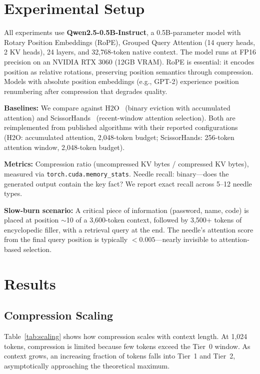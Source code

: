 \documentclass[11pt]{article}
\begin{document}
\section{Experimental Setup}

All experiments use \textbf{Qwen2.5-0.5B-Instruct}, a 0.5B-parameter model with Rotary Position Embeddings (RoPE), Grouped Query Attention (14 query heads, 2 KV heads), 24 layers, and 32,768-token native context. The model runs at FP16 precision on an NVIDIA RTX 3060 (12GB VRAM). RoPE is essential: it encodes position as relative rotations, preserving position semantics through compression. Models with absolute position embeddings (e.g., GPT-2) experience position renumbering after compression that degrades quality.

\textbf{Baselines:} We compare against H2O~\cite{h2o} (binary eviction with accumulated attention) and ScissorHands~\cite{scissorhands} (recent-window attention selection). Both are reimplemented from published algorithms with their reported configurations (H2O: accumulated attention, 2,048-token budget; ScissorHands: 256-token attention window, 2,048-token budget).

\textbf{Metrics:} Compression ratio (uncompressed KV bytes / compressed KV bytes), measured via \texttt{torch.cuda.memory\_stats}. Needle recall: binary---does the generated output contain the key fact? We report exact recall across 5--12 needle types.

\textbf{Slow-burn scenario:} A critical piece of information (password, name, code) is placed at position $\sim$10 of a 3,600-token context, followed by 3,500+ tokens of encyclopedic filler, with a retrieval query at the end. The needle's attention score from the final query position is typically $<0.005$---nearly invisible to attention-based selection.

\section{Results}

\subsection{Compression Scaling}

Table~\ref{tab:scaling} shows how compression scales with context length. At 1,024 tokens, compression is limited because few tokens exceed the Tier~0 window. As context grows, an increasing fraction of tokens falls into Tier~1 and Tier~2, asymptotically approaching the theoretical maximum.
\end{document}
